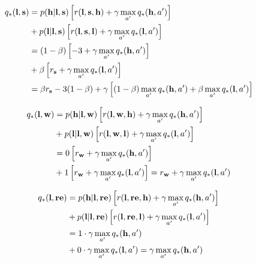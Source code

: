\documentclass[10pt,a4paper]{article}
\begin{document}
\begin{equation}
\begin{split}
q_*(\textrm{\textbf{l}}, \textrm{\textbf{s}}) &= p(\textrm{\textbf{h}} \lvert \textrm{\textbf{l}}, \textrm{\textbf{s}}) \left[r(\textrm{\textbf{l}}, \textrm{\textbf{s}}, \textrm{\textbf{h}}) + \gamma \max_{a'} q_*(\textrm{\textbf{h}}, a')\right]\\
& + p(\textrm{\textbf{l}} \lvert \textrm{\textbf{l}}, \textrm{\textbf{s}}) \left[r(\textrm{\textbf{l}}, \textrm{\textbf{s}}, \textrm{\textbf{l}}) + \gamma \max_{a'} q_*(\textrm{\textbf{l}}, a')\right]\\
&= (1-\beta) \left[-3 + \gamma \max_{a'} q_*(\textrm{\textbf{h}}, a')\right]\\
& + \beta \left[r_\textrm{\textbf{s}} + \gamma \max_{a'} q_*(\textrm{\textbf{l}}, a')\right]\\
&= \beta r_\textrm{\textbf{s}} - 3 (1-\beta) + \gamma \left[(1-\beta) \max_{a'} q_*(\textrm{\textbf{h}}, a') + \beta \max_{a'} q_*(\textrm{\textbf{l}}, a')\right]
\end{split}
\end{equation}


\begin{equation}
\begin{split}
q_*(\textrm{\textbf{l}}, \textrm{\textbf{w}}) &= p(\textrm{\textbf{h}} \lvert \textrm{\textbf{l}}, \textrm{\textbf{w}}) \left[r(\textrm{\textbf{l}}, \textrm{\textbf{w}}, \textrm{\textbf{h}}) + \gamma \max_{a'} q_*(\textrm{\textbf{h}}, a')\right]\\
& + p(\textrm{\textbf{l}} \lvert \textrm{\textbf{l}}, \textrm{\textbf{w}}) \left[r(\textrm{\textbf{l}}, \textrm{\textbf{w}}, \textrm{\textbf{l}}) + \gamma \max_{a'} q_*(\textrm{\textbf{l}}, a')\right]\\
&= 0 \left[r_\textrm{\textbf{w}} + \gamma \max_{a'} q_*(\textrm{\textbf{h}}, a')\right]\\
& + 1 \left[r_\textrm{\textbf{w}} + \gamma \max_{a'} q_*(\textrm{\textbf{l}}, a')\right] =  r_\textrm{\textbf{w}} + \gamma \max_{a'} q_*(\textrm{\textbf{l}}, a')
\end{split}
\end{equation}

\begin{equation}
\begin{split}
q_*(\textrm{\textbf{l}}, \textrm{\textbf{re}}) &= p(\textrm{\textbf{h}} \lvert \textrm{\textbf{l}}, \textrm{\textbf{re}}) \left[r(\textrm{\textbf{l}}, \textrm{\textbf{re}}, \textrm{\textbf{h}}) + \gamma \max_{a'} q_*(\textrm{\textbf{h}}, a')\right]\\
& + p(\textrm{\textbf{l}} \lvert \textrm{\textbf{l}}, \textrm{\textbf{re}}) \left[r(\textrm{\textbf{l}}, \textrm{\textbf{re}}, \textrm{\textbf{l}}) + \gamma \max_{a'} q_*(\textrm{\textbf{l}}, a')\right]\\
&= 1 \cdot \gamma \max_{a'} q_*(\textrm{\textbf{h}}, a')\\
& + 0 \cdot \gamma \max_{a'} q_*(\textrm{\textbf{l}}, a') =  \gamma \max_{a'} q_*(\textrm{\textbf{h}}, a')
\end{split}
\end{equation}
\end{document}

